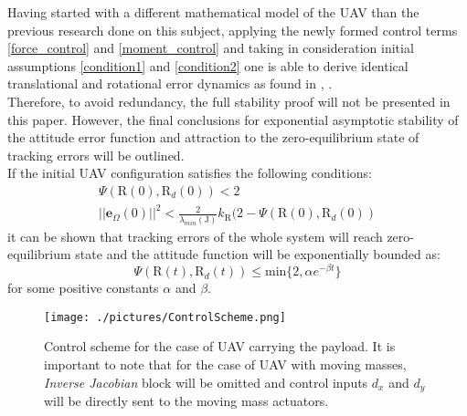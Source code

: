 Having started with a different mathematical model of the UAV than the previous research done on this subject, applying the newly formed control terms \ref{force_control} and \ref{moment_control} and taking in consideration initial assumptions \ref{condition1} and \ref{condition2} one is able to derive identical translational and rotational error dynamics as found in \cite{LeeClanak1}, \cite{LeeClanak4}. \\
Therefore, to avoid redundancy, the full stability proof will not be presented in this paper. However, the final conclusions for exponential asymptotic stability of the attitude error function and attraction to the zero-equilibrium state of tracking errors will be outlined. \\

If the initial UAV configuration satisfies the following conditions:
\begin{gather}
	\Psi (\text{R}(0), \text{R}_d(0)) < 2 \\
	||\textbf{e}_\Omega(0)||^2 < \frac{2}{\lambda_{min}(\text{J})}k_\text{R}(2 - \Psi(\text{R}(0), \text{R}_d(0))
\end{gather}
it can be shown that tracking errors of the whole system will reach zero-equilibrium state and the attitude function will be exponentially bounded as:
\begin{equation}
	\Psi(\text{R}(t), \text{R}_d(t)) \leq \text{min}\{2, \alpha e^{-\beta t} \}
\end{equation}
for some positive constants $\alpha$ and $\beta$.

\begin{figure}
	\centering
	\texttt{[image: ./pictures/ControlScheme.png]}	
	\label{fig:control_scheme}
	\caption{Control scheme for the case of UAV carrying the payload. It is important to note that for the case of UAV with moving masses, \textit{Inverse Jacobian} block will be omitted and control inputs $d_x$ and $d_y$ will be directly sent to the moving mass actuators.}
\end{figure}